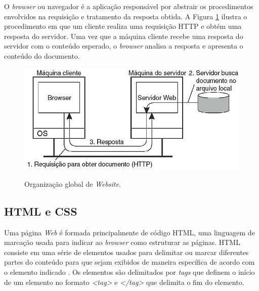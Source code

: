 O \emph{browser} ou navegador é a aplicação responsável por abstrair os procedimentos envolvidos na requisição e tratamento da resposta obtida. A Figura \ref{http} ilustra o procedimento em que um cliente realiza uma requisição HTTP e obtém uma resposta do servidor. Uma vez que a máquina cliente recebe uma resposta do servidor com o conteúdo esperado, o \emph{browser} analisa a resposta e apresenta o conteúdo do documento.

\begin{figure}[htb]
\begin{center}
  \centering
  \caption{Organização global de \emph{Website}.}
      \includegraphics[scale=0.6]{images/httpTanenbaum.png}
    
    \label{http}
  
\end{center}

\end{figure}

 
\subsection{HTML e CSS}
Uma página \emph{Web} é formada principalmente de código HTML, uma linguagem de marcação usada para indicar ao \emph{browser} como estruturar as páginas. HTML consiste em uma série de elementos usados para delimitar ou marcar diferentes partes do conteúdo para que sejam exibidos de maneira específica de acordo com o elemento indicado \cite{mdn}. Os elementos são delimitados por \emph{tags} que definem o início de um elemento no formato \emph{<tag>} e \emph{</tag>} que delimita o fim do elemento. 

